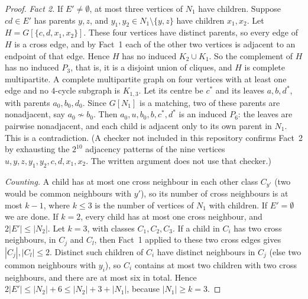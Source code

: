 \documentclass[11pt]{amsart}
\theoremstyle{definition}
\theoremstyle{remark}
\begin{document}
\begin{proof}
\emph{Fact 2.} If $E'\ne\emptyset$, at most three vertices of $N_1$ have children. Suppose $cd\in E'$ has parents $y,z$, and $y_1,y_2\in N_1\setminus\{y,z\}$ have children $x_1,x_2$. Let $H=G[\{c,d,x_1,x_2\}]$. These four vertices have distinct parents, so every edge of $H$ is a cross edge, and by Fact~1 each of the other two vertices is adjacent to an endpoint of that edge. Hence $H$ has no induced $K_2\cup K_1$. So the complement of $H$ has no induced $P_3$, that is, it is a disjoint union of cliques, and $H$ is complete multipartite. A complete multipartite graph on four vertices with at least one edge and no $4$-cycle subgraph is $K_{1,3}$. Let its centre be $c^*$ and its leaves $a,b,d^*$, with parents $a_0,b_0,d_0$. Since $G[N_1]$ is a matching, two of these parents are nonadjacent, say $a_0\not\sim b_0$. Then $a_0,u,b_0,b,c^*,d^*$ is an induced $P_6$: the leaves are pairwise nonadjacent, and each child is adjacent only to its own parent in $N_1$. This is a contradiction. (A checker not included in this repository confirms Fact~2 by exhausting the $2^{10}$ adjacency patterns of the nine vertices $u,y,z,y_1,y_2,c,d,x_1,x_2$. The written argument does not use that checker.)

\emph{Counting.} A child has at most one cross neighbour in each other class $C_{y'}$ (two would be common neighbours with $y'$), so its number of cross neighbours is at most $k-1$, where $k\le3$ is the number of vertices of $N_1$ with children. If $E'=\emptyset$ we are done. If $k=2$, every child has at most one cross neighbour, and $2|E'|\le|N_2|$. Let $k=3$, with classes $C_1,C_2,C_3$. If a child in $C_i$ has two cross neighbours, in $C_j$ and $C_l$, then Fact~1 applied to these two cross edges gives $|C_j|,|C_l|\le2$. Distinct such children of $C_i$ have distinct neighbours in $C_j$ (else two common neighbours with $y_i$), so $C_i$ contains at most two children with two cross neighbours, and there are at most six in total. Hence $2|E'|\le|N_2|+6\le|N_2|+3+|N_1|$, because $|N_1|\ge k=3$.


\end{proof}
\end{document}
